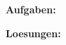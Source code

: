 \documentclass{article}
\begin{document}
	
	\huge
	\textbf{Aufgaben:}\\
	\normalsize
	
	
	\pagebreak
	
	\huge
	\textbf{Loesungen:}\\\\
	
	\centering
	\normalsize
	
\end{document}
